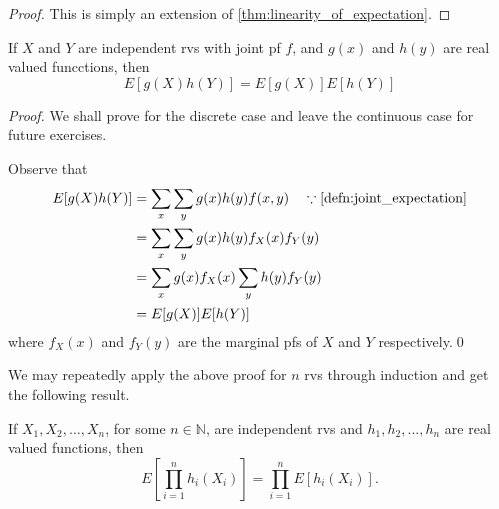 \documentclass[notoc,notitlepage]{tufte-book}
\begin{document}
\begin{proof}
  This is simply an extension of \cref{thm:linearity_of_expectation}.
\end{proof}

\begin{thm}
\label{thm:implication_of_independence_on_joint_expectation}
  If $X$ and $Y$ are independent rvs with joint pf $f$, and $g(x)$ and $h(y)$ are real valued funcctions, then
  \begin{equation*}
    E[ g(X) h(Y) ] = E[ g(X) ] E[ h(Y) ]
  \end{equation*}
\end{thm}

\begin{proof}
  We shall prove for the discrete case and leave the continuous case for future exercises.

  Observe that 
  \begin{align*}
    E[ g(X) h(Y) ] &= \sum_{x} \sum_{y} g(x) h(y) f(x, y) \quad \because \cref{defn:joint_expectation} \\
      &= \sum_{x} \sum_{y} g(x) h(y) f_X(x) f_Y(y) \\
      &= \sum_{x} g(x) f_X(x) \sum_{y} h(y) f_Y(y) \\
      &= E[ g(X) ] E[ h(Y) ]
  \end{align*}
  where $f_X(x)$ and $f_Y(y)$ are the marginal pfs of $X$ and $Y$ respectively.\qed
\end{proof}

We may repeatedly apply the above proof for $n$ rvs through induction and get the following result.

\begin{thm}
\label{thm:generalized_implication_of_independence_on_joint_expectation}
  If $X_1, X_2, ..., X_n$, for some $n \in \mathbb{N}$, are independent rvs and $h_1, h_2, ..., h_n$ are real valued functions, then
  \begin{equation*}
    E \left[ \prod_{i = 1}^{n} h_i (X_i) \right] = \prod_{i = 1}^{n} E[ h_i(X_i) ].
  \end{equation*}
\end{thm}

\end{document}
